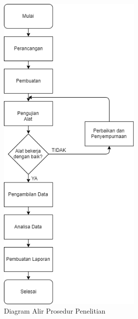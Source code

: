 \begin{enumerate}
	\begin{figure}[H]
		\centering
		\includegraphics[width=7cm]{gambar/flowchart.png}
		\caption{ Diagram Alir Prosedur Penelitian}
		\label{pic.diagramalir}
	\end{figure}
	
	
\end{enumerate}

